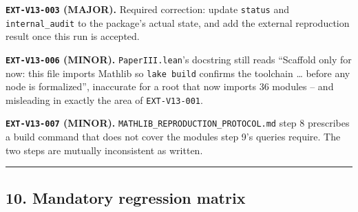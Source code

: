 \documentclass[
  10pt,
]{article}
\begin{document}
\textbf{\texttt{EXT-V13-003} (MAJOR).} Required correction: update
\texttt{status} and \texttt{internal\_audit} to the package's actual
state, and add the external reproduction result once this run is
accepted.

\textbf{\texttt{EXT-V13-006} (MINOR).} \texttt{PaperIII.lean}'s
docstring still reads ``Scaffold only for now: this file imports Mathlib
so \texttt{lake\ build} confirms the toolchain \ldots{} before any node
is formalized'', inaccurate for a root that now imports 36 modules --
and misleading in exactly the area of \texttt{EXT-V13-001}.

\textbf{\texttt{EXT-V13-007} (MINOR).}
\texttt{MATHLIB\_REPRODUCTION\_PROTOCOL.md} step 8 prescribes a build
command that does not cover the modules step 9's queries require. The
two steps are mutually inconsistent as written.

\begin{center}\rule{0.5\linewidth}{0.5pt}\end{center}

\subsection{10. Mandatory regression
matrix}\label{mandatory-regression-matrix}
\end{document}
